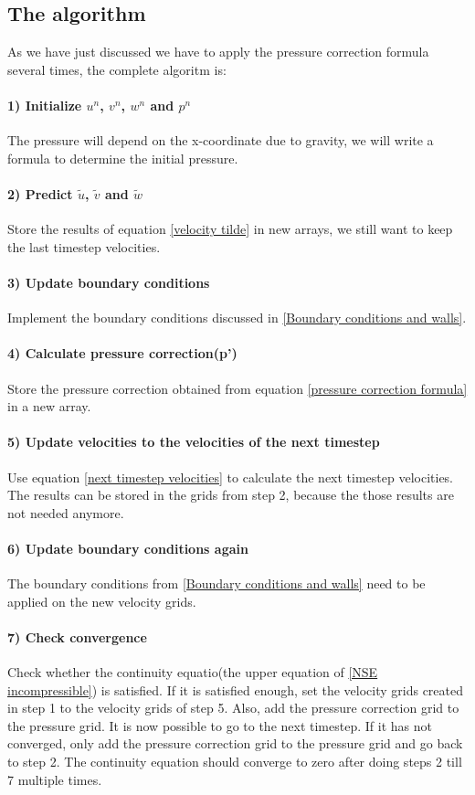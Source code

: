 \documentclass{article}
\begin{document}
\subsection{The algorithm}
As we have just discussed we have to apply the pressure correction formula several times, the complete algoritm is: \cite{MAC}
\paragraph{1) Initialize \(u^n\), \(v^n\), \(w^n\) and \(p^n\)} The pressure will depend on the x-coordinate due to gravity, we will write a formula to determine the initial pressure.
\paragraph{2) Predict \(\tilde{u}\), \(\tilde{v}\) and \(\tilde{w}\)} Store the results of equation \ref{velocity tilde} in new arrays, we still want to keep the last timestep velocities. 
\paragraph{3) Update boundary conditions} Implement the boundary conditions discussed in \ref{Boundary conditions and walls}.
\paragraph{4) Calculate pressure correction(p')} Store the pressure correction obtained from equation \ref{pressure correction formula} in a new array.
\paragraph{5) Update velocities to the velocities of the next timestep} Use equation \ref{next timestep velocities} to calculate the next timestep velocities. The results can be stored in the grids from step 2, because the those results are not needed anymore.
\paragraph{6) Update boundary conditions again} The boundary conditions from \ref{Boundary conditions and walls} need to be applied on the new velocity grids.
\paragraph{7) Check convergence} Check whether the continuity equatio(the upper equation of \ref{NSE incompressible}) is satisfied. If it is satisfied enough, set the velocity grids created in step 1 to the velocity grids of step 5. Also, add the pressure correction grid to the pressure grid. It is now possible to go to the next timestep. If it has not converged, only add the pressure correction grid to the pressure grid and go back to step 2. The continuity equation should converge to zero after doing steps 2 till 7 multiple times. 
\end{document}
